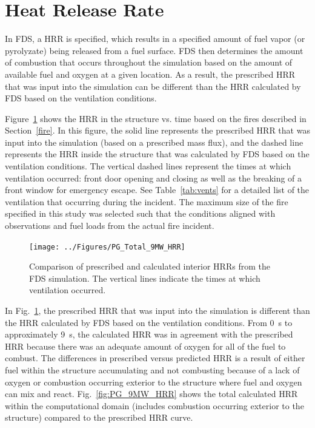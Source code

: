 \documentclass[12pt,oneside]{book}
\begin{document}
\clearpage

\section{Heat Release Rate}
\label{HRR}
In FDS, a HRR is specified, which results in a specified amount of fuel vapor (or pyrolyzate) being released from a fuel surface. FDS then determines the amount of combustion that occurs throughout the simulation based on the amount of available fuel and oxygen at a given location. As a result, the prescribed HRR that was input into the simulation can be different than the HRR calculated by FDS based on the ventilation conditions.

Figure~\ref{fig:PG_Total_HRR} shows the HRR in the structure vs. time based on the fires described in Section~\ref{fire}. In this figure, the solid line represents the prescribed HRR that was input into the simulation (based on a prescribed mass flux), and the dashed line represents the HRR inside the structure that was calculated by FDS based on the ventilation conditions. The vertical dashed lines represent the times at which ventilation occurred: front door opening and closing as well as the breaking of a front window for emergency escape. See Table~\ref{tab:vents} for a detailed list of the ventilation that occurring during the incident. The maximum size of the fire specified in this study was selected such that the conditions aligned with observations and fuel loads from the actual fire incident. 

\begin{figure}[!ht]
\texttt{[image: ../Figures/PG\_Total\_9MW\_HRR]}
\caption[Interior prescribed and calculated interior HRRs vs. time from the simulation.]
{Comparison of prescribed and calculated interior HRRs from the FDS simulation. The vertical lines indicate the times at which ventilation occurred.}
\label{fig:PG_Total_HRR}
\end{figure}

In Fig.~\ref{fig:PG_Total_HRR}, the prescribed HRR that was input into the simulation is different than the HRR calculated by FDS based on the ventilation conditions. From 0~s to approximately 9~s, the calculated HRR was in agreement with the prescribed HRR because there was an adequate amount of oxygen for all of the fuel to combust. The differences in prescribed versus predicted HRR is a result of either fuel within the structure accumulating and not combusting because of a lack of oxygen or combustion occurring exterior to the structure where fuel and oxygen can mix and react. Fig.~\ref{fig:PG_9MW_HRR} shows the total calculated HRR within the computational domain (includes combustion occurring exterior to the structure) compared to the prescribed HRR curve.
\end{document}
